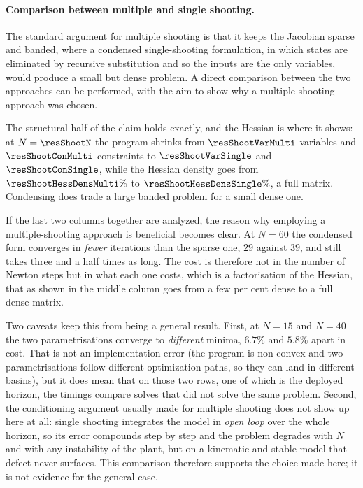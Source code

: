 \documentclass[11pt,a4paper]{article}
\begin{document}
\paragraph{Comparison between multiple and single shooting.} The standard argument for multiple shooting is that
it keeps the Jacobian sparse and banded, where a condensed single-shooting formulation, in which states are eliminated
by recursive substitution and so the inputs are the only variables, would produce a small but dense problem. A direct comparison between the two approaches can be performed, with the aim to show why a multiple-shooting approach was chosen. 

\begin{table}[htbp]
  \centering
  \small
  \caption{%
  Multiple (M) against single (S) shooting on the same instance, at the deployed profile. Dimensions,
  densities and iteration counts are exact; each timing is the fastest of three cold solves, with no warm
  start. The table shows the comparison for the number of variables, number of constraints, the Hessian density, the number of iterations and the solve time needed by each method for different lenghts of the prediction horizon N.}
  \label{res:tab:shoot}
\end{table}

The structural half of the claim holds exactly, and the Hessian is where it shows: at $N=\resShootN$ the
program shrinks from $\resShootVarMulti$ variables and $\resShootConMulti$ constraints to
$\resShootVarSingle$ and $\resShootConSingle$, while the Hessian density goes from
$\resShootHessDensMulti\%$ to $\resShootHessDensSingle\%$, a full matrix. Condensing does trade a large
banded problem for a small dense one.

If the last two columns together are analyzed, the reason why employing a multiple-shooting approach is beneficial becomes clear. At $N=60$ the condensed form converges in \emph{fewer} iterations than
the sparse one, $29$ against $39$, and still takes three and a half times as long. The cost is therefore not
in the number of Newton steps but in what each one costs, which is a factorisation of the Hessian, that as shown in the middle column goes from a few per cent dense to a full dense matrix.

Two caveats keep this from being a general result. First, at $N=15$ and $N=40$ the two parametrisations
converge to \emph{different} minima, $6.7\%$ and $5.8\%$ apart in cost. That is not an implementation
error (the program is non-convex and two parametrisations follow different optimization paths, so they can
land in different basins), but it does mean that on those two rows, one of which is the deployed horizon,
the timings compare solves that did not solve the same problem. Second, the conditioning argument usually
made for multiple shooting does not show up here at all: single shooting integrates the model in
\emph{open loop} over the whole horizon, so its error compounds step by step and the problem degrades with
$N$ and with any instability of the plant, but on a kinematic and stable model that defect never surfaces.
This comparison therefore supports the choice made here; it is not evidence for the general case.
\end{document}
